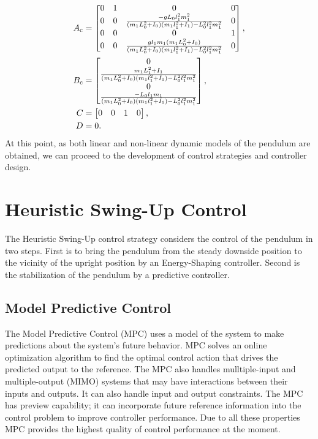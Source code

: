 \newpage
\begin{subequations}\label{linmatrices}
	\begin{align}
	A _{\text{c}} &=\begin{bmatrix}0&1&0&0\\
	0&0&\frac{-gL_0l_1^2m_1^2}{(m_1L_0^2+I_0)(m_1l_1^2+I_1)-L_0^2l_1^2m_1^2}&0\\
	0&0&0&1\\
	0&0&\frac{gl_1m_1(m_1L_0^2+I_0)}{(m_1L_0^2+I_0)(m_1l_1^2+I_1)-L_0^2l_1^2m_1^2}&0
	\end{bmatrix},\\
	B _{\text{c}} &=	\begin{bmatrix}
	0\\ 
	\frac{m_1L_1^2+I_1}{(m_1L_0^2+I_0)(m_1l_1^2+I_1)-L_0^2l_1^2m_1^2}\\
	0\\
	\frac{-L_0l_1m_1}{(m_1L_0^2+I_0)(m_1l_1^2+I_1)-L_0^2l_1^2m_1^2}
	\end{bmatrix},\\
	C &= \begin{bmatrix}0&0&1&0\end{bmatrix},\\
	D &= 0.
	\end{align}
\end{subequations}
At this point, as both linear and non-linear dynamic models of the pendulum are obtained, we can proceed to the development of control strategies and controller design.
\section{Heuristic Swing-Up Control}\label{Hswing:teoria}
The Heuristic Swing-Up control strategy considers the control of the pendulum in two steps. First is to bring the pendulum from the steady downside position to the vicinity of the upright position by an Energy-Shaping controller. Second is the stabilization of the pendulum by a predictive controller.
\subsection{Model Predictive Control}\label{mpcsection}
The Model Predictive Control (MPC) uses a model of the system to make predictions about the system’s future behavior. MPC solves an online optimization algorithm to find the optimal control action that drives the predicted output to the reference. The MPC also handles mulltiple-input and multiple-output (MIMO) systems that may have interactions between their inputs and outputs. It can also handle input and output constraints. The MPC has preview capability; it can incorporate future reference information into the control problem to improve controller performance. Due to all these properties MPC provides the highest quality of control performance at the moment.
